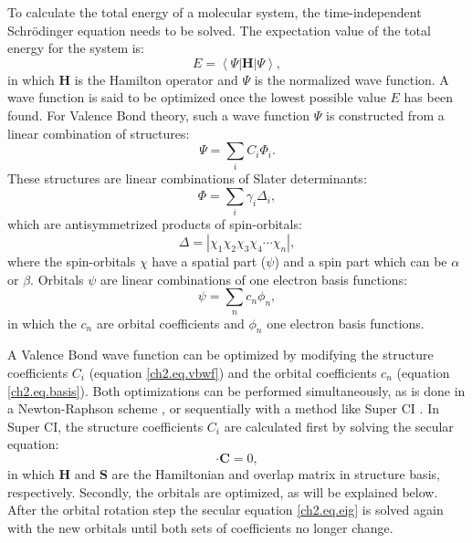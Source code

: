 To calculate the total energy of a molecular system, the time-independent Schr\"{o}dinger equation needs to be solved. The expectation value of the total energy for the system is:
\begin{equation}
E = \left< \Psi | \mathbf{H} | \Psi \right>,
\end{equation}
in which $\mathbf{H}$ is the Hamilton operator and $\Psi$ is the normalized wave function. A wave function is said to be optimized once the lowest possible value $E$ has been found. For Valence Bond theory, such a wave function $\Psi$ is constructed from a linear combination of structures:
\begin{equation}
\Psi = \sum_{i} C_i \Phi_i.
\label{ch2.eq.vbwf}
\end{equation}
These structures are linear combinations of Slater determinants:
\begin{equation}
\Phi = \sum_{i} \gamma_i \Delta_i,
\label{ch2.eq.struct}
\end{equation}
which are antisymmetrized products of spin-orbitals:
\begin{equation}
\Delta = |\chi_1\chi_2\chi_3\chi_4 \cdots \chi_n|,
\label{ch2.eq.determ}
\end{equation}
where the spin-orbitals $\chi$ have a spatial part ($\psi$) and a spin part which can be $\alpha$ or $\beta$. 
Orbitals $\psi$ are linear combinations of one electron basis functions:
\begin{equation}
\psi = \sum_{n} c_n \phi_n,
\label{ch2.eq.basis}
\end{equation}
in which the $c_n$ are orbital coefficients and $\phi_n$ one electron basis functions.

A Valence Bond wave function can be optimized by modifying the structure coefficients $C_i$ (equation \ref{ch2.eq.vbwf}) and the orbital coefficients $c_n$ (equation \ref{ch2.eq.basis}). Both optimizations can be performed simultaneously, as is done in a Newton-Raphson scheme \cite{zahid}, or sequentially with a method like Super CI \cite{superci1,superci2}. In Super CI, the structure coefficients $C_i$ are calculated first by solving the secular equation:
\begin{equation}
[\mathbf{H}-E\mathbf{S}] \cdot \mathbf{C} = 0,
\label{ch2.eq.eig}
\end{equation}
in which $\mathbf{H}$ and $\mathbf{S}$ are the Hamiltonian and overlap matrix in structure basis, respectively. Secondly, the orbitals are optimized, as will be explained below. After the orbital rotation step the secular equation \ref{ch2.eq.eig} is solved again with the new orbitals until both sets of coefficients no longer change.

